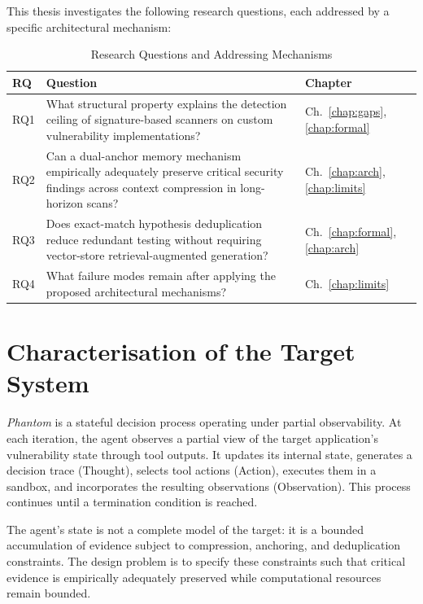 \documentclass[12pt, a4paper, oneside, openany]{book}
\newcommand{\Phant}{\textit{Phantom}}
\begin{document}
This thesis investigates the following research questions, each
addressed by a specific architectural mechanism:

\begin{table}[H]
\centering
\caption{Research Questions and Addressing Mechanisms}
\label{tab:rqs}
\begin{tabularx}{\textwidth}{@{}l X l@{}}
\toprule
\textbf{RQ} & \textbf{Question} & \textbf{Chapter} \\
\midrule
RQ1 & What structural property explains the detection ceiling of
      signature-based scanners on custom vulnerability
      implementations? & Ch.~\ref{chap:gaps}, \ref{chap:formal} \\
RQ2 & Can a dual-anchor memory mechanism empirically adequately preserve
      critical security findings across context compression in
      long-horizon scans? & Ch.~\ref{chap:arch}, \ref{chap:limits} \\
RQ3 & Does exact-match hypothesis deduplication reduce redundant
      testing without requiring vector-store
      retrieval-augmented generation? & Ch.~\ref{chap:formal}, \ref{chap:arch} \\
RQ4 & What failure modes remain after applying the proposed
      architectural mechanisms? & Ch.~\ref{chap:limits} \\
\bottomrule
\end{tabularx}
\end{table}

\section{Characterisation of the Target System}
\label{sec:target}

\Phant{} is a stateful decision process operating under partial
observability.  At each iteration, the agent observes a partial view
of the target application's vulnerability state through tool outputs.
It updates its internal state, generates a decision trace (Thought),
selects tool actions (Action), executes them in a sandbox, and
incorporates the resulting observations (Observation).  This process
continues until a termination condition is reached.

The agent's state is not a complete model of the target: it is a
bounded accumulation of evidence subject to compression, anchoring,
and deduplication constraints.  The design problem is to specify
these constraints such that critical evidence is empirically adequately
preserved while computational resources remain bounded.
\end{document}

